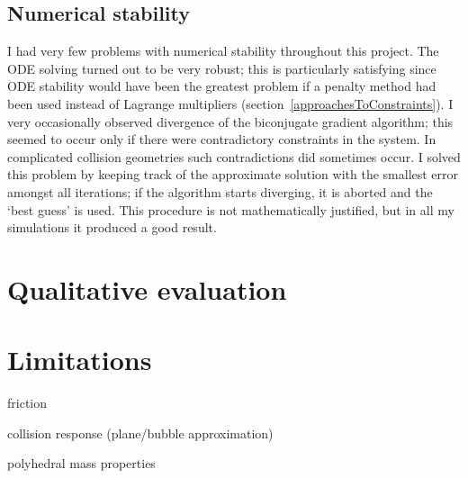 \subsection{Numerical stability}

I had very few problems with numerical stability throughout this project. The ODE solving turned
out to be very robust; this is particularly satisfying since ODE stability would have been the
greatest problem if a penalty method had been used instead of Lagrange multipliers
(section~\ref{approachesToConstraints}). I very occasionally observed divergence of the biconjugate
gradient algorithm; this seemed to occur only if there were contradictory constraints in the
system. In complicated collision geometries such contradictions did sometimes occur. I solved this
problem by keeping track of the approximate solution with the smallest error amongst all
iterations; if the algorithm starts diverging, it is aborted and the `best guess' is used.
This procedure is not mathematically justified, but in all my simulations it produced a good
result.


\section{Qualitative evaluation}


\section{Limitations}
friction

collision response (plane/bubble approximation)

polyhedral mass properties

